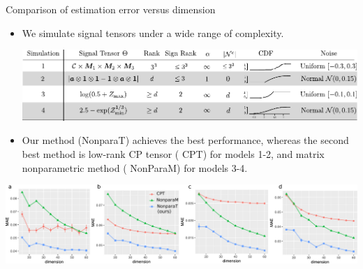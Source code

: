 \documentclass[10pt, mathserif]{beamer} %
\theoremstyle{definition}
\theoremstyle{plain}
\begin{document}
\begin{frame}{Comparison of estimation error versus dimension}

    \begin{itemize}
\item We simulate signal tensors under a wide range of complexity.    

       \begin{center}
        \includegraphics[width = \textwidth]{Figures/simulation.pdf}
        \end{center}

\pause
    \item Our method ({\color{blue}NonparaT}) achieves the best performance, whereas the second best method is low-rank CP tensor ({\color{red} CPT}) for models 1-2, and matrix nonparametric method ({\color{darkgreen} NonParaM}) for models 3-4.
  \end{itemize}
    
          \begin{center}
    \includegraphics[width =\textwidth]{Figures/fig1-4v2.pdf}
    \end{center}
    
        
\end{frame}
\end{document}
